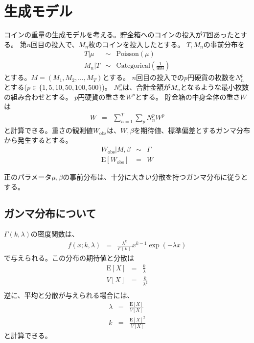 \documentclass{jsarticle}
\newcommand{\numput}{T}
\newcommand{\maisu}{M}
\newcommand{\poisson}{\mathrm{Poisson}}
\newcommand{\categorical}{\mathrm{Categorical}}
\newcommand{\meannumput}{\mu}
\newcommand{\ncoins}[1]{N^{#1}}
\newcommand{\weight}[1]{W^{#1}}
\newcommand{\weightall}{W}
\newcommand{\ampeq}{&=&}
\newcommand{\weightobs}{W_{\mathrm{obs}}}
\newcommand{\expectation}{\mathrm{E}}
\newcommand{\variance}{V}
\newcommand{\weightsd}{\beta}
\newcommand{\gammak}{k}
\newcommand{\gammal}{\lambda}
\begin{document}
\section{生成モデル}
コインの重量の生成モデルを考える。貯金箱へのコインの投入が$\numput$回あったとする。
第$n$回目の投入で、$\maisu_{n}$枚のコインを投入したとする。
$\numput, \maisu_{n}$の事前分布を
\begin{eqnarray*}
 \numput | \meannumput &\sim& \poisson(\meannumput) \\
 \maisu_{n} | \numput &\sim& \categorical\left(\frac{1}{999}\right)
\end{eqnarray*}
とする。$\maisu = (\maisu_{1}, \maisu_{2}, \ldots, \maisu_{\numput})$とする。
$n$回目の投入での$p$円硬貨の枚数を$\ncoins{p}_{n}$とする($p\in\{1,5,10,50,100,500\}$)。
$\ncoins{p}_{n}$は、合計金額が$\maisu_{n}$となるような最小枚数の組み合わせとする。
$p$円硬貨の重さを$\weight{p}$とする。
貯金箱の中身全体の重さ$\weightall$は
\begin{eqnarray*}
 \weightall \ampeq \sum_{n=1}^{\numput} \sum_{p} \ncoins{p}_{n} \weight{p}
\end{eqnarray*}
と計算できる。重さの観測値$\weightobs$は、$\weightall, \weightsd$を期待値、標準偏差とするガンマ分布から発生するとする。
\begin{eqnarray*}
 \weightobs | \maisu, \weightsd &\sim& \Gamma \\
 \expectation[\weightobs] \ampeq \weightall
\end{eqnarray*}

正のパラメータ$\meannumput, \weightsd$の事前分布は、十分に大きい分散を持つガンマ分布に従うとする。

\subsection{ガンマ分布について}
$\Gamma(\gammak, \gammal)$の密度関数は、
\begin{eqnarray*}
 f(x; \gammak, \gammal) \ampeq \frac{\gammal^{\gammak}}{\Gamma(\gammak)}x^{\gammak-1}\exp(-\gammal x)
\end{eqnarray*}
で与えられる。この分布の期待値と分散は
\begin{eqnarray*}
 \expectation [X] \ampeq \frac{\gammak}{\gammal} \\
 \variance [X] \ampeq \frac{\gammak}{\gammal^{2}} \\
\end{eqnarray*}
逆に、平均と分散が与えられる場合には、
\begin{eqnarray*}
 \gammal \ampeq \frac{\expectation [X]}{\variance [X]} \\
 \gammak \ampeq \frac{\expectation [X]^{2}}{\variance [X]}
\end{eqnarray*}
と計算できる。
\end{document}
